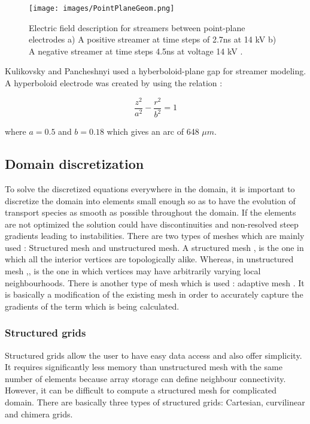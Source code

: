 \documentclass[paper=a4, fontsize=13pt]{scrartcl}
\begin{document}
\begin{figure}
\centering
\texttt{[image: images/PointPlaneGeom.png]}
 \caption{Electric field description for streamers between point-plane electrodes a) A positive streamer at time steps of 2.7ns at 14 kV  b) A negative streamer at time steps 4.5ns at voltage 14 kV \cite{Luque2008PositiveVelocities}.}
  \label{fig:Point to plane geometry}
\end{figure}
   
   Kulikovsky \cite{Kulikovsky1994TheSimulation} and Pancheshnyi \cite{Pancheshnyi2005DevelopmentSimulation} used a hyberboloid-plane gap for streamer modeling. A hyperboloid electrode was created by using the relation :
   
\begin{equation}
\frac{z^2}{a^2} - \frac{r^2}{b^2} = 1
\end{equation}

where $a= 0.5$ and $b= 0.18$ which gives an arc of 648 $\mu m$. 

\subsection{Domain discretization}

To solve the discretized equations everywhere in the domain, it is important to discretize the domain into elements small enough so as to have the evolution of transport species as smooth as possible throughout the domain. If the elements are not optimized the solution could have discontinuities and non-resolved steep gradients leading to instabilities. There are two types of meshes which are mainly used : Structured mesh and unstructured mesh. A structured mesh \cite{Zhang2013CompositeGeometries},\cite{DANNENHOFFERIII1991AGeometries} is the one in which all the interior vertices are topologically alike. Whereas, in unstructured mesh \cite{Lay2003BreakdownLamps},\cite{Babaeva2006StreamerParticles}, is the one in which vertices may have arbitrarily varying local neighbourhoods. There is another type of mesh which is used : adaptive mesh \cite{Montijn2006AnStreamers}. It is basically a modification of the existing mesh in order to accurately capture the gradients of the term which is being calculated. 

\subsubsection{Structured grids}

 Structured grids allow the user to have easy data access and also offer simplicity. It requires significantly less memory than unstructured mesh with the same number of elements because array storage can define neighbour connectivity. However, it can be difficult to compute a structured mesh for complicated domain. There are basically three types of structured grids: Cartesian, curvilinear and chimera grids. 
\end{document}
